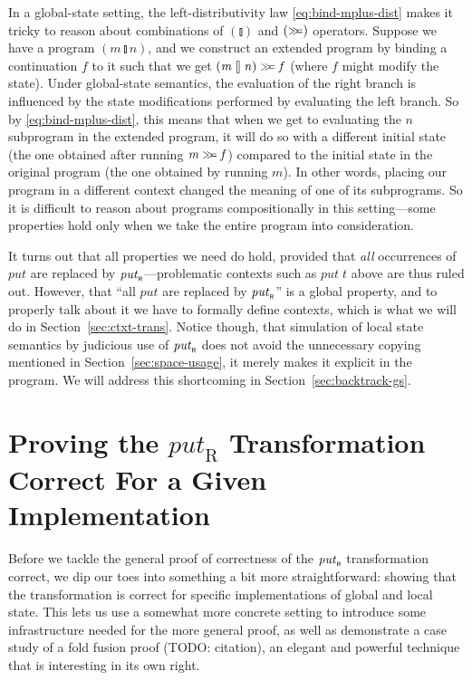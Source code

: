 \documentclass{jfp}
\newcommand{\Varid}[1]{\mathit{#1}}
\let\Varid\mathit
\begin{document}
In a global-state setting, the left-distributivity law
\eqref{eq:bind-mplus-dist} makes it tricky to reason about combinations of
\ensuremath{(\talloblong)} and \ensuremath{(\mathrel{\hstretch{0.7}{>\!\!>\!\!=}})} operators. Suppose we have a program \ensuremath{(\Varid{m}\mathbin{\talloblong}\Varid{n})}, and we
construct an extended program by binding a continuation \ensuremath{\Varid{f}} to it such that we
get \ensuremath{(\Varid{m}\mathbin{\talloblong}\Varid{n})\mathrel{\hstretch{0.7}{>\!\!>\!\!=}}\Varid{f}} (where \ensuremath{\Varid{f}} might modify the state). Under global-state
semantics, the evaluation of the right branch is influenced by the state
modifications performed by evaluating the left branch. So by
\eqref{eq:bind-mplus-dist}, this means that when we get to evaluating the \ensuremath{\Varid{n}}
subprogram in the extended program, it will do so with a different initial state
(the one obtained after running \ensuremath{\Varid{m}\mathrel{\hstretch{0.7}{>\!\!>\!\!=}}\Varid{f}}) compared to the initial state in the
original program (the one obtained by running \ensuremath{\Varid{m}}). In other words, placing our
program in a different context changed the meaning of one of its subprograms. So
it is difficult to reason about programs compositionally in this
setting---some properties hold only when we take the entire program into
consideration.

It turns out that all properties we need do hold, provided that {\em all}
occurrences of \ensuremath{\Varid{put}} are replaced by \ensuremath{\Varid{put}_{\scaleobj{0.7}{\sf R}}}---problematic contexts such as
\ensuremath{\Varid{put}\;\Varid{t}} above are thus ruled out. However, that ``all \ensuremath{\Varid{put}} are replaced by
\ensuremath{\Varid{put}_{\scaleobj{0.7}{\sf R}}}'' is a global property, and to properly talk about it we have to formally
define contexts, which is what we will do in Section~\ref{sec:ctxt-trans}.
Notice though, that simulation of local state semantics by judicious use of
\ensuremath{\Varid{put}_{\scaleobj{0.7}{\sf R}}} does not avoid the unnecessary copying mentioned in
Section~\ref{sec:space-usage}, it merely makes it explicit in the program.
We will address this shortcoming in Section~\ref{sec:backtrack-gs}.
\section{Proving the $\mathit{put}_{\text{R}}$ Transformation Correct For a Given Implementation}
Before we tackle the general proof of correctness of the \ensuremath{\Varid{put}_{\scaleobj{0.7}{\sf R}}} transformation
correct, we dip our toes into something a bit more straightforward: showing that
the transformation is correct for specific implementations of global and local
state. This lets us use a somewhat more concrete setting to introduce some
infrastructure needed for the more general proof, as well as demonstrate a case
study of a fold fusion proof (TODO: citation), an elegant and powerful technique
that is interesting in its own right.
\end{document}
